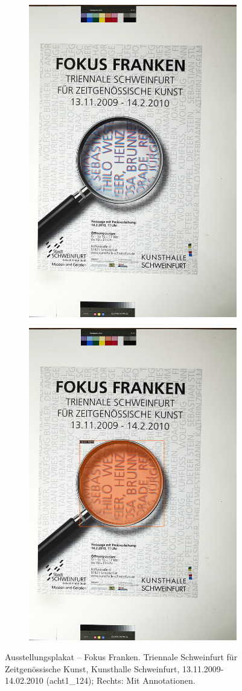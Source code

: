 \documentclass[a4paper,12pt,ngerman]{article}
\begin{document}
\newpage
\begin{landscape}
\begin{figure}[ht]
	\begin{subfigure}[b]{0.5\linewidth}
	\centering
	\includegraphics[height=\linewidth]{Abbildung_44_(acht1_124)}
	\end{subfigure}
	\begin{subfigure}[b]{0.5\linewidth}
	\centering
	\includegraphics[height=\linewidth]{Abbildung_44_(acht1_124)_with_detections}
	\end{subfigure}
	\caption{Ausstellungsplakat -- Fokus Franken. Triennale Schweinfurt für Zeitgenössische Kunst, Kunsthalle Schweinfurt, 13.11.2009-14.02.2010 (acht1\_124); Rechts: Mit Annotationen.}
\end{figure}
\end{landscape}
\end{document}
